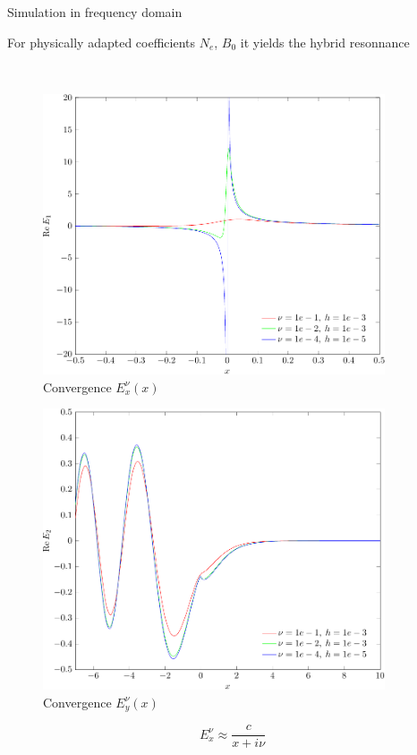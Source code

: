 \begin{frame}{Simulation in frequency domain}

For physically adapted coefficients $N_e$, $B_0$ it yields the hybrid resonnance 

\ \\

 \begin{minipage}{0.45\linewidth}
\begin{figure}
	\begin{center}
       	\includegraphics[width = 0.9\textwidth]{./images/picture2}
       	\caption{Convergence $E_x^\nu(x)$}
    \end{center}
\end{figure} 
\end{minipage}
\hfill
\begin{minipage}{0.45\linewidth}
	\begin{figure}
\begin{center}
       	\includegraphics[width = 0.9\textwidth]{./images/pics3}
       	\caption{Convergence $E^\nu_y(x)$}
    \end{center}
\end{figure} 
\end{minipage}
\[
E_x^\nu \approx \frac{c}{x + i \nu}
\]

\end{frame}
